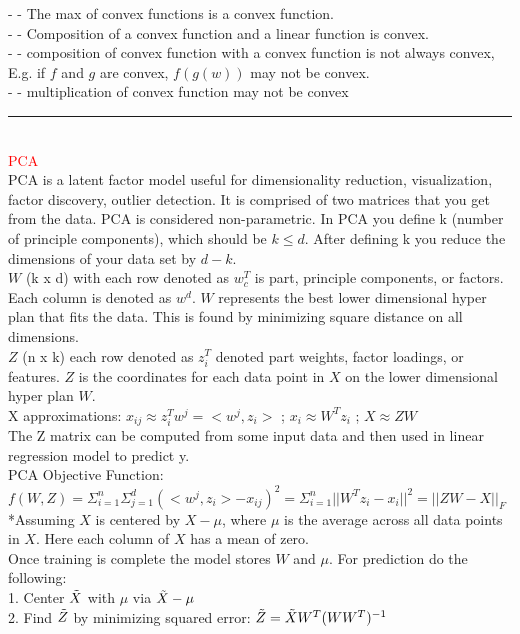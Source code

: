 \documentclass[8pt]{extarticle}
\begin{document}
\begin{multicols*}{2}
- - The max of convex functions is a convex function.
\\
- - Composition of a convex function and a linear function is convex.
\\
- - composition of convex function with a convex function is not always convex, E.g. if $f$ and $g$ are convex, $f(g(w))$ may not be convex.
\\
- - multiplication of convex function may not be convex
\\
\rule{\linewidth}{0.5mm} 
\\
\textcolor{red}{PCA}
\\
PCA is a latent factor model useful for dimensionality reduction, visualization, factor discovery, outlier detection. It is comprised of two matrices that you get from the data. PCA is considered non-parametric. In PCA you define k (number of principle components), which should be $k \leq d$. After defining k you reduce the dimensions of your data set by $d-k$.
\\
$W$ (k x d) with each row denoted as $w_c^T$ is part, principle components, or factors. Each column is denoted as $w^d$. $W$ represents the best lower dimensional hyper plan that fits the data. This is found by minimizing square distance on all dimensions.
\\
$Z$ (n x k) each row denoted as $z_i^T$ denoted part weights, factor loadings, or features. $Z$ is the coordinates for each data point in $X$ on the lower dimensional hyper plan $W$.
\\
X approximations: $x_{ij} \approx z_i^Tw^j = <w^j, z_i>$ ; $x_{i} \approx W^Tz_i$ ; $X \approx ZW $
\\
The Z matrix can be computed from some input data and then used in linear regression model to predict y. 
\\
PCA Objective Function:
\\
$f(W,Z) = \Sigma_{i=1}^n \Sigma_{j=1}^d (<w^j,z_i> - x_{ij})^2 = \Sigma_{i=1}^n || W^Tz_i - x_i||^2 = || ZW - X||_F$
\\
*Assuming $X$ is centered by $X-\mu$, where $\mu$ is the average across all data points in $X$. Here each column of $X$ has a mean of zero.
\\
Once training is complete the model stores $W$ and $\mu$. For prediction do the following:
\\
1. Center $\Tilde{X}$ with $\mu$ via $\Tilde{X}-\mu$
\\
2. Find $\Tilde{Z}$ by minimizing squared error: $\Tilde{Z} = \Tilde{X}W^T(WW^T)^{-1}$
\\

\end{multicols*}
\end{document}
